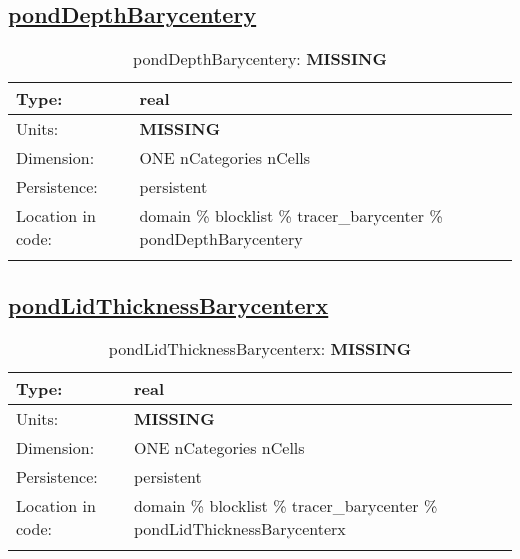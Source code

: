 \subsection[pondDepthBarycentery]{\hyperref[sec:var_tab_tracer_barycenter]{pondDepthBarycentery}}
\label{subsec:var_sec_tracer_barycenter_pondDepthBarycentery}
\begin{center}
\begin{longtable}{| p{2.0in} | p{4.0in} |}
        \hline 
        Type: & real \\
        \hline 
        Units: & {\bf \color{red} MISSING} \\
        \hline 
        Dimension: & ONE nCategories nCells \\
        \hline 
        Persistence: & persistent \\
        \hline 
         Location in code: & domain \% blocklist \% tracer\_barycenter \% pondDepthBarycentery \\
         \hline 
    \caption{pondDepthBarycentery: {\bf \color{red} MISSING}}
\end{longtable}
\end{center}
\subsection[pondLidThicknessBarycenterx]{\hyperref[sec:var_tab_tracer_barycenter]{pondLidThicknessBarycenterx}}
\label{subsec:var_sec_tracer_barycenter_pondLidThicknessBarycenterx}
\begin{center}
\begin{longtable}{| p{2.0in} | p{4.0in} |}
        \hline 
        Type: & real \\
        \hline 
        Units: & {\bf \color{red} MISSING} \\
        \hline 
        Dimension: & ONE nCategories nCells \\
        \hline 
        Persistence: & persistent \\
        \hline 
         Location in code: & domain \% blocklist \% tracer\_barycenter \% pondLidThicknessBarycenterx \\
         \hline 
    \caption{pondLidThicknessBarycenterx: {\bf \color{red} MISSING}}
\end{longtable}
\end{center}

